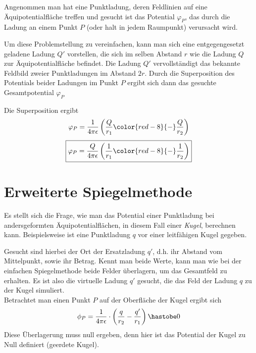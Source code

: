 \documentclass[11pt, a4paper]{article}
\begin{document}
Angenommen man hat eine Punktladung, deren Feldlinien auf eine Äquipotentialfläche treffen und gesucht ist das Potential $\varphi_{P}$, das durch die Ladung an einem Punkt $P$ (oder halt in jedem Raumpunkt) verursacht wird.

\begin{figure}[H]
\centering
{}
\end{figure}

Um diese Problemstellung zu vereinfachen, kann man sich eine entgegengesetzt geladene Ladung $Q'$ vorstellen, die sich im selben Abstand $r$ wie die Ladung $Q$ zur Äquipotentialfläche befindet. Die Ladung $Q'$ vervollständigt das bekannte Feldbild zweier Punktladungen im Abstand $2 r$. Durch die Superposition des Potentials beider Ladungen im Punkt $P$ ergibt sich dann das gesuchte Gesamtpotential $\varphi_{P}$

\begin{figure}[H]
\centering
{}
\end{figure}

Die Superposition ergibt
\[\varphi_{P} = \frac{1}{4\pi\epsilon} \left( \frac{Q}{r_{1}} {\color{red-8}{-}} \frac{Q}{r_{2}}\right)\]
\[\boxed{\varphi_{P} = \frac{Q}{4\pi\epsilon} \left( \frac{1}{r_{1}} {\color{red-8}{-}} \frac{1}{r_{2}}\right)}\]

\section{Erweiterte Spiegelmethode}
Es stellt sich die Frage, wie man das Potential einer Punktladung bei andersgeformten Äquipotentialflächen, in diesem Fall einer \emph{Kugel}, berechnen kann. Beispielsweise ist eine Punktladung $q$ vor einer leitfähigen Kugel gegeben.

\begin{figure}[H]
\centering
{}
\end{figure}

Gesucht sind hierbei der Ort der Ersatzladung $q'$, d.h. ihr Abstand vom Mittelpunkt, sowie ihr Betrag.
Kennt man beide Werte, kann man wie bei der einfachen Spiegelmethode beide Felder überlagern, um das Gesamtfeld zu erhalten.
Es ist also die virtuelle Ladung $q'$ gesucht, die das Feld der Ladung $q$ zu der Kugel simuliert.\\

Betrachtet man einen Punkt $P$ auf der Oberfläche der Kugel ergibt sich
\[\phi_{P} = \frac{1}{4\pi\epsilon} \cdot \left( \frac{q}{r_{2}} - \frac{q'}{r_{1}}\right ) \hastobe 0\]
Diese Überlagerung muss null ergeben, denn hier ist das Potential der Kugel zu Null definiert (geerdete Kugel).\\
\end{document}
